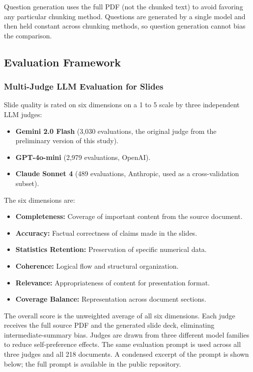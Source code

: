 \documentclass{ieeeaccess}
\begin{document}
Question generation uses the full PDF (not the chunked text) to avoid favoring any particular chunking method. Questions are generated by a single model and then held constant across chunking methods, so question generation cannot bias the comparison.

\subsection{Evaluation Framework}

\subsubsection{Multi-Judge LLM Evaluation for Slides}

Slide quality is rated on six dimensions on a 1 to 5 scale by three independent LLM judges:
\begin{itemize}
    \item \textbf{Gemini 2.0 Flash} (3,030 evaluations, the original judge from the preliminary version of this study).
    \item \textbf{GPT-4o-mini} (2,979 evaluations, OpenAI).
    \item \textbf{Claude Sonnet 4} (489 evaluations, Anthropic, used as a cross-validation subset).
\end{itemize}

The six dimensions are:
\begin{itemize}
    \item \textbf{Completeness:} Coverage of important content from the source document.
    \item \textbf{Accuracy:} Factual correctness of claims made in the slides.
    \item \textbf{Statistics Retention:} Preservation of specific numerical data.
    \item \textbf{Coherence:} Logical flow and structural organization.
    \item \textbf{Relevance:} Appropriateness of content for presentation format.
    \item \textbf{Coverage Balance:} Representation across document sections.
\end{itemize}

The overall score is the unweighted average of all six dimensions. Each judge receives the full source PDF and the generated slide deck, eliminating intermediate-summary bias. Judges are drawn from three different model families to reduce self-preference effects. The same evaluation prompt is used across all three judges and all 218 documents. A condensed excerpt of the prompt is shown below; the full prompt is available in the public repository.
\end{document}
